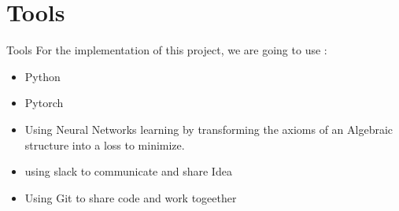 \documentclass{beamer}
\begin{document}
    \section{Tools}
    \begin{frame}{Tools}
        For the implementation of this project, we are going to use :
        \begin{itemize}
            \item Python
            \item Pytorch
            \item Using Neural Networks learning by transforming the axioms of 
            an Algebraic structure into a loss to minimize.
            \item using slack to communicate and share Idea 
            \item Using Git to share code and work togeether 
        \end{itemize}
    \end{frame}
\end{document}
